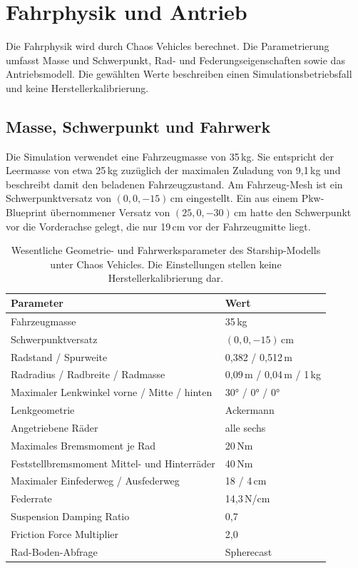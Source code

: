 \section{Fahrphysik und Antrieb}
\label{sec:starship_fahrphysik}

Die Fahrphysik wird durch Chaos Vehicles berechnet. Die Parametrierung umfasst Masse und
Schwerpunkt, Rad- und Federungseigenschaften sowie das Antriebsmodell. Die gewählten
Werte beschreiben einen Simulationsbetriebsfall und keine Herstellerkalibrierung.

\subsection{Masse, Schwerpunkt und Fahrwerk}
\label{sec:starship_masse_fahrwerk}

Die Simulation verwendet eine Fahrzeugmasse von 35\,kg. Sie entspricht der
Leermasse von etwa 25\,kg zuzüglich der maximalen Zuladung von 9,1\,kg
\parencite{wikipedia_starship} und beschreibt damit den beladenen Fahrzeugzustand.
Am Fahrzeug-Mesh ist ein Schwerpunktversatz von $(0, 0, -15)$\,cm eingestellt. Ein aus
einem Pkw-Blueprint übernommener Versatz von $(25, 0, -30)$\,cm hatte den Schwerpunkt vor
die Vorderachse gelegt, die nur 19\,cm vor der Fahrzeugmitte liegt.

\begin{table}[htbp]
  \centering
  \caption{Wesentliche Geometrie- und Fahrwerksparameter des Starship-Modells unter
  Chaos Vehicles. Die Einstellungen stellen keine Herstellerkalibrierung dar.}
  \label{tab:starship_fahrwerk}
  \begin{tabular}{ll}
    \hline
    Parameter & Wert \\
    \hline
    Fahrzeugmasse & 35\,kg \\
    Schwerpunktversatz & $(0, 0, -15)$\,cm \\
    Radstand / Spurweite & 0,382 / 0,512\,m \\
    Radradius / Radbreite / Radmasse & 0,09\,m / 0,04\,m / 1\,kg \\
    Maximaler Lenkwinkel vorne / Mitte / hinten & 30° / 0° / 0° \\
    Lenkgeometrie & Ackermann \\
    Angetriebene Räder & alle sechs \\
    Maximales Bremsmoment je Rad & 20\,Nm \\
    Feststellbremsmoment Mittel- und Hinterräder & 40\,Nm \\
    Maximaler Einfederweg / Ausfederweg & 18 / 4\,cm \\
    Federrate & 14,3\,N/cm \\
    Suspension Damping Ratio & 0,7 \\
    Friction Force Multiplier & 2,0 \\
    Rad-Boden-Abfrage & Spherecast \\
    \hline
  \end{tabular}
\end{table}

